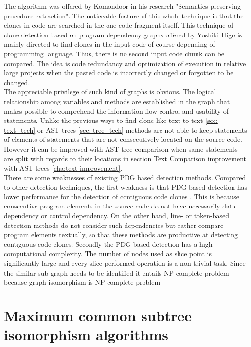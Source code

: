 \documentclass{report}
\begin{document}
The algorithm was offered by Komondoor \cite{Komondoor} in his research "Semantics-preserving procedure extraction". The noticeable feature of this whole technique is that the clones in code are searched in the one code fragment itself. This technique of clone detection based on program dependency graphs offered by Yoshiki Higo \cite{pdg} is mainly directed to find clones in the input code of course depending of programming language. Thus, there is no second input code chunk can be compared. The idea is code redundancy and optimization of execution in relative large projects when the pasted code is incorrectly changed or forgotten to be changed.
\\
The appreciable privilege of such kind of graphs is obvious. The logical relationship among variables and methods are established in the graph that makes possible to comprehend the information flow control and usability of statements. Unlike the previous ways to find clone like text-to-text \ref{sec: text_tech} or AST trees \ref{sec: tree_tech} methods are not able to keep statements of elements of statements that are not consecutively located on the source code. However it can be improved with AST tree comparison when same statements are split with regards to their locations in section Text Comparison improvement with AST trees \ref{cha:text-improvement}.
\\
There are some weaknesses of existing PDG based detection methods. Compared to other detection techniques, the first weakness is that PDG-based detection has lower performance for the detection of contiguous code clones \cite{pdg}. This is because consecutive program elements in the source code do not have necessarily data dependency or control dependency. On the other hand, line- or token-based detection methods do not consider such dependencies but rather compare program elements textually, so that these methods are productive at detecting contiguous code clones. 
Secondly the PDG-based detection has a high computational complexity. The number of nodes used as slice point is significantly large and every slice performed operation is a non-trivial task. Since the similar sub-graph needs to be identified it entails NP-complete problem because graph isomorphism is NP-complete problem.

\chapter{Maximum common subtree isomorphism algorithms}
\label{cha:algorithms-to-compare}
\end{document}
